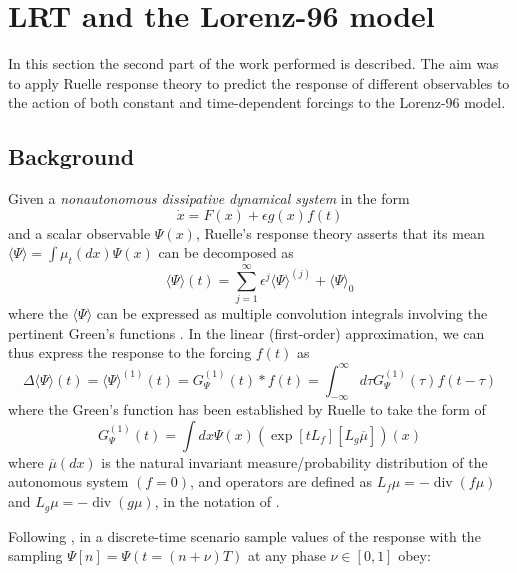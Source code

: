 \documentclass{article}
\begin{document}
\newpage

\section{LRT and the Lorenz-96 model} \label{section_LRT}

In this section the second part of the work performed is described. The aim was to apply Ruelle response theory \cite{Ruelle}\cite{Bodai} to predict the response of different observables to the action of both constant and time-dependent forcings to the Lorenz-96 model.

\subsection{Background}

Given a \textit{nonautonomous dissipative dynamical system} in the form
\begin{equation}
\dot{x}=F(x)+\epsilon g(x) f(t)
\end{equation}
and a scalar observable $\Psi(x)$, Ruelle's response theory \cite{Ruelle} asserts that its mean $\langle\Psi\rangle=\int \mu_{t}(d x) \Psi(x)$ can be decomposed as
\begin{equation}
\langle\Psi\rangle(t)=\sum_{j=1}^{\infty} \epsilon^{j}\langle\Psi\rangle^{(j)} +\langle\Psi\rangle_{0}
\end{equation}
where the $\langle\Psi\rangle$ can be expressed as multiple convolution integrals involving the pertinent Green's functions \cite{LucariniClimateChange}. In the linear (first-order) approximation, we can thus express the response to the forcing $f(t)$ as
\begin{equation}
\Delta\langle\Psi\rangle(t)=\langle\Psi\rangle^{(1)}(t)=G_{\Psi}^{(1)}(t) * f(t)=\int_{-\infty}^{\infty} d \tau G_{\Psi}^{(1)}(\tau) f(t-\tau)
\end{equation}
where the Green's function has been established by Ruelle to take the form of
\begin{equation}
G_{\Psi}^{(1)}(t)=\int d x \Psi(x)\left(\exp \left[t L_{f}\right]\left[L_{g} \overline{\mu}\right]\right)(x)
\end{equation}
where $\overline{\mu}(d x)$ is the natural invariant measure/probability distribution of the autonomous system $(f = 0)$, and operators are defined as $L_{f} \mu=-\operatorname{div}(f \mu)$ and $L_{g} \mu=-\operatorname{div}(g \mu)$, in the notation of \cite{Abramov}.

Following \cite{Bodai}, in a discrete-time scenario sample values of the response with the sampling $\Psi[n]=\Psi(t=(n+\nu) T)$ at any phase $\nu \in[0,1]$ obey:
\end{document}
